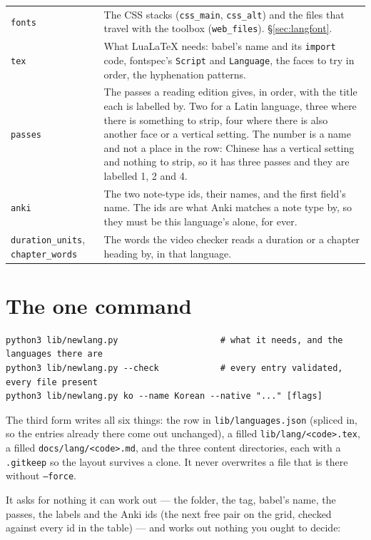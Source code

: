 \documentclass[11pt,oneside]{report}
\newcommand{\file}[1]{\texttt{#1}}
\begin{document}
\begin{center}
\begin{longtable}{@{}>{\raggedright\arraybackslash}p{}p{}@{}}
\addlinespace
\texttt{fonts} & The CSS stacks (\texttt{css\_main}, \texttt{css\_alt}) and the
  files that travel with the toolbox (\texttt{web\_files}). \S\ref{sec:langfont}. \\
\addlinespace
\texttt{tex} & What LuaLaTeX needs: babel's name and its \texttt{import} code,
  fontspec's \texttt{Script} and \texttt{Language}, the faces to try in order,
  the hyphenation patterns. \\
\addlinespace
\texttt{passes} & The passes a reading edition gives, in order, with the title
  each is labelled by. Two for a Latin language, three where there is
  something to strip, four where there is also another face or a vertical
  setting. The number is a name and not a place in the row: Chinese has a
  vertical setting and nothing to strip, so it has three passes and they are
  labelled 1, 2 and 4. \\
\addlinespace
\texttt{anki} & The two note-type ids, their names, and the first field's
  name. The ids are what Anki matches a note type by, so they must be this
  language's alone, for ever. \\
\addlinespace
\texttt{duration\_units}, \texttt{chapter\_words} & The words the video checker
  reads a duration or a chapter heading by, in that language. \\
\bottomrule
\end{longtable}
\end{center}

\section{The one command}

\begin{lstlisting}
python3 lib/newlang.py                    # what it needs, and the languages there are
python3 lib/newlang.py --check            # every entry validated, every file present
python3 lib/newlang.py ko --name Korean --native "..." [flags]
\end{lstlisting}

The third form writes all six things: the row in \file{lib/languages.json}
(spliced in, so the entries already there come out unchanged), a filled
\file{lib/lang/<code>.tex}, a filled \file{docs/lang/<code>.md}, and the three
content directories, each with a \file{.gitkeep} so the layout survives a
clone. It never overwrites a file that is there without \texttt{--force}.

It asks for nothing it can work out --- the folder, the tag, babel's name, the
passes, the labels and the Anki ids (the next free pair on the grid, checked
against every id in the table) --- and works out nothing you ought to decide:
\end{document}
